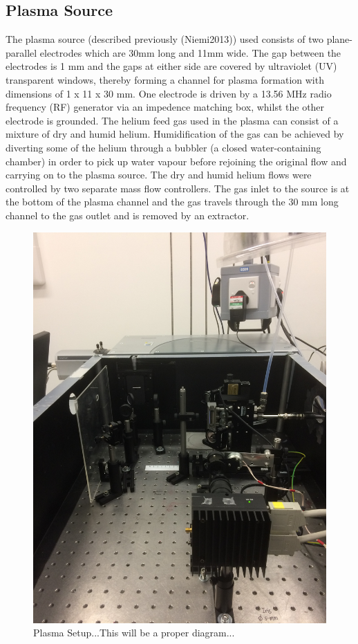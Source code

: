 \documentclass[11pt, oneside]{article}   	%
\begin{document}
\subsection{Plasma Source}
The plasma source (described previously (Niemi2013)) used consists of two plane-parallel electrodes which are 30mm long and 11mm wide. 
The gap between the electrodes is 1 mm and the gaps at either side are covered by ultraviolet (UV) transparent windows, thereby forming a channel for plasma formation with dimensions of 1 x 11 x 30 mm.
One electrode is driven by a 13.56 MHz radio frequency (RF) generator via an impedence matching box, whilst the other electrode is grounded. 
The helium feed gas used in the plasma can consist of a mixture of dry and humid helium. Humidification of the gas can be achieved by diverting some of the helium through a bubbler (a closed water-containing chamber) in order to pick up water vapour before rejoining the original flow and carrying on to the plasma source.
The dry and humid helium flows were controlled by two separate mass flow controllers.
The gas inlet to the source is at the bottom of the plasma channel and the gas travels through the 30 mm long channel to the gas outlet and is removed by an extractor.




\begin{figure}
    \centering
    \includegraphics[width=\textwidth]{Figures/PlasmaSetup.JPG}
    \caption{Plasma Setup...This will be a proper diagram...}
    \label{fig:my_label}
\end{figure}
\end{document}

